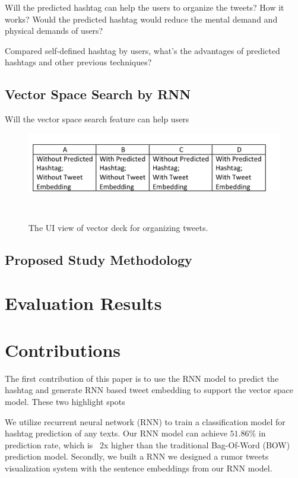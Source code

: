 Will the predicted hashtag can help the users to organize the tweets? How it works? Would the predicted hashtag would reduce the mental demand and physical demands of users?

Compared self-defined hashtag by users, what's the advantages of predicted hashtags and other previous techniques?


\subsection{Vector Space Search by RNN}

Will the vector space search feature can help users 

\begin{figure}[thb!]
    \includegraphics[width= 1.1 \columnwidth]{images/user_study_plan}
   \caption{The UI view of vector deck for organizing tweets.  } ~\label{fig: vector_deck}
\end{figure}


\subsection{Proposed Study Methodology}



\section{Evaluation Results}


\section{Contributions}

The first contribution of this paper is to use the RNN model to predict the hashtag and generate RNN based tweet embedding to support the vector space model. These two highlight spots 

We utilize recurrent neural network (RNN) to train a classification model for hashtag prediction of any texts. Our RNN model can achieve $51.86\%$ in prediction rate, which is ~2x higher than the traditional Bag-Of-Word (BOW) prediction model. Secondly, we built a RNN we designed a rumor tweets visualization system with the sentence embeddings from our RNN model. 


